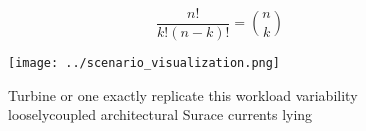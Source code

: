 \documentclass[a4paper]{article}
\begin{document}
\[ \frac{n!}{k!(n-k)!} = \binom{n}{k} \]

\begin{figure}
\centering
\texttt{[image: ../scenario\_visualization.png]}
\caption{Turbine or one exactly replicate this workload variability looselycoupled architectural Surace currents lying
}
\end{figure}
 
\end{document}
